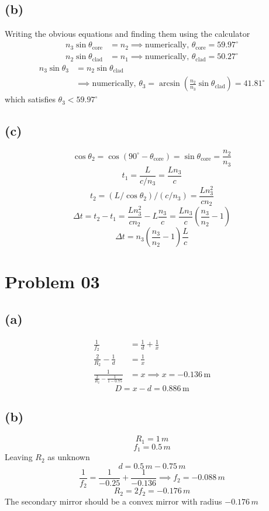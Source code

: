 \documentclass[letter]{article}
\begin{document}
\subsection*{(b)} 
Writing the obvious equations and finding them using the calculator
\begin{align*}
	n_3 \sin \theta_\text{core} &= n_2 \implies \text{numerically, } \theta_\text{core} = 59.97^{\circ} \\
	n_2 \sin \theta_\text{clad} &= n_1 \implies \text{numerically, } \theta_\text{clad} =50.27^{\circ}	 
\end{align*}
\begin{align*}
	n_3 \sin \theta_3 &= n_2 \sin \theta_\text{clad} \\ 
			  &\implies \text{numerically, } \theta_3 = \arcsin 
			  \left(\frac{n_2}{n_3} \sin \theta_\text{clad}\right) = 41.81 ^{\circ}
\end{align*}
which satisfies $\theta_3 < 59.97^{\circ}$

\subsection*{(c)} 
\[
\cos \theta_2 = \cos \left(90 ^{\circ} - \theta_\text{core}\right) = \sin \theta_\text{core} = \frac{n_2}{n_3}
\] 
\[
t_1 = \frac{L}{c / n_3} = \frac{L n_3}{c}
\] 
\[
t_2 = \left(L / \cos \theta_2\right) / (c / n_3) = \frac{L n_3^2 }{c n_2}
\]
\[
\Delta t = t_2 - t_1 = \frac{L n_3^2}{c n_2} - L \frac{n_3}{c} = \frac{L n_3}{c} \left(\frac{n_3}{n_2} - 1\right)
\] 
\[
\boxed{
\Delta t = n_3 \left(\frac{n_3}{n_2} - 1\right) \frac{L}{c}
}
\] 
\section*{Problem 03}



\subsection*{(a)} 
\begin{align*}
	\frac{1}{f_2} &= \frac{1}{d} + \frac{1}{x} \\ 
	\frac{2}{R_2} - \frac{1}{d} &= \frac{1}{x}  \\ 
	\frac{1}{
\frac{2}{R_2} - \frac{1}{1 - 0.75} 
} &= x \implies x =-0.136 \, \text{m}
\end{align*}
\[
\boxed{
D = x- d = 0.886 \, \text{m}
}
\] 

\subsection*{(b)} 
\[
R_1 = 1 \, m
\] 
\[
f_1 = 0.5 \, m
\] 
Leaving $R_2$ as unknown
\[
d = 0.5 \, m - 0.75 \, m
\] 
\[
\frac{1}{f_2} = \frac{1}{-0.25} + \frac{1}{-0.136} \implies f_2 = -0.088 \, m
\] 
\[
R_2 = 2 f_2 = - 0.176 \, m 
\] 
The secondary mirror should be a convex mirror with radius $-0.176 \, m$
\end{document}
